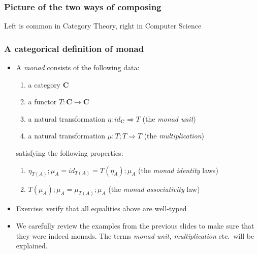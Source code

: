 \documentclass[handout]{beamer}
\newcommand{\To}{\Rightarrow}
\newcommand{\bfsf}[1]{{\boldsymbol{#1}}}
\newcommand{\CC}{\bfsf{C}}
\begin{document}
\frame
  {   
    \frametitle{Picture of the two ways of composing}\label{Mon5:PicTwoMonad}



\vspace*{1em}
Left is common in Category Theory, right in Computer Science


 }


\frame
  {   
    \frametitle{A categorical definition of monad}\label{Mon5:CatDefMonad}

 \begin{itemize}[<+->]
\item A \emph{monad} consists of the following data:
 \begin{enumerate}
    \item a category $\CC$
    \item a functor $T:\CC\to\CC$
    \item a natural transformation $\eta: id_\CC \To T$ (the \emph{monad unit})
    \item a natural transformation $\mu: T;T \To T$ (the \emph{multiplication})
 \end{enumerate}
satisfying the following properties:
 \begin{enumerate}
    \item $\eta_{T(A)};\mu_A = id_{T(A)} = T(\eta_A);\mu_A$ (the \emph{monad identity} laws)
    \item $T(\mu_A);\mu_A = \mu_{T(A)};\mu_A$ (the \emph{monad associativity} law)
 \end{enumerate}
\item Exercise: verify that all equalities above are well-typed
\item We carefully review the examples from the previous slides to 
make sure that they were indeed monads. 
The terms \emph{monad unit, multiplication} etc.\ will be explained.
 \end{itemize}

 }
\end{document}
